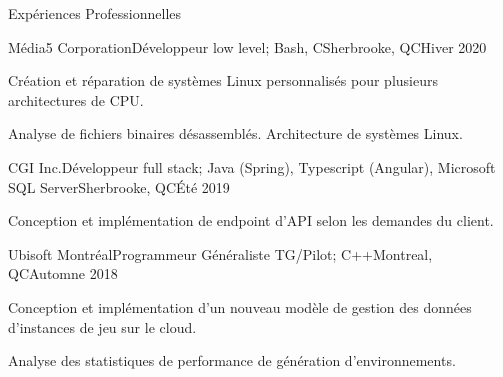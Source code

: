 \documentclass{article}
\newlength{\tabin}
\newlength{\secsep}
\newcommand{\lineunder}{\vspace*{-8pt} \\ \hspace*{-6pt} \hrulefill \\ \vspace*{-15pt}}
\newenvironment{tabbedsection}[1]{
  \begin{list}{}{
      \setlength{\itemsep}{0pt}
      \setlength{\labelsep}{0pt}
      \setlength{\labelwidth}{0pt}
      \setlength{\leftmargin}{\tabin}
      \setlength{\rightmargin}{\tabin}
      \setlength{\listparindent}{0pt}
      \setlength{\parsep}{0pt}
      \setlength{\parskip}{0pt}
      \setlength{\partopsep}{0pt}
      \setlength{\topsep}{#1}
    }
  \item[]
}{\end{list}}
\newenvironment{resume_section}[1]{
  \filbreak
  \vspace{2\secsep}
  \textsc{\large#1}
  \lineunder
  \begin{tabbedsection}{\secsep}
}{\end{tabbedsection}}
\newenvironment{subitems}{
  \renewcommand{\labelitemi}{-}
  \begin{itemize}
      \setlength{\labelsep}{1em}
}{\end{itemize}}
\newenvironment{resume_employer}[4]{
  \vspace{\secsep}
  \textbf{#1} \\ 
  \indent {\small #2} \hfill {\footnotesize#3 (#4)}
  \begin{tabbedsection}{0pt}
  \begin{subitems}
}{\end{subitems}\end{tabbedsection}}
\begin{document}
\begin{resume_section}{Expériences Professionnelles}
  \begin{resume_employer}{Média5 Corporation}{Développeur low level; Bash, C}{Sherbrooke, QC}{Hiver 2020}
    \item Création et réparation de systèmes Linux personnalisés pour plusieurs architectures de CPU.
    \item Analyse de fichiers binaires désassemblés. Architecture de systèmes Linux. 
  \end{resume_employer}{}
  
  \begin{resume_employer}{CGI Inc.}{Développeur full stack; Java (Spring), Typescript (Angular), Microsoft SQL Server}{Sherbrooke, QC}{Été 2019}
    \item Conception et implémentation de endpoint d'API selon les demandes du client.
  \end{resume_employer}
  
    \begin{resume_employer}{Ubisoft Montréal}{Programmeur Généraliste TG/Pilot; C++}{Montreal, QC}{Automne 2018}
    \item Conception et implémentation d'un nouveau modèle de gestion des données d'instances de jeu sur le cloud.
    \item Analyse des statistiques de performance de génération d'environnements.
  \end{resume_employer}
  
\end{resume_section}
\end{document}
